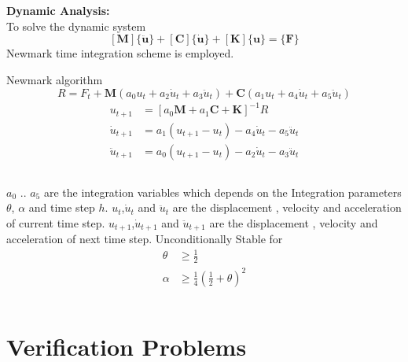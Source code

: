\documentclass[9pt]{beamer}
\begin{document}
\begin{frame}
\textbf{Dynamic Analysis:}\\
To solve the dynamic system
\begin{equation*}
\left[ \mathbf{M}  \right] 
\{ \ddot{\mathbf{u}} \}
+
\left[ \mathbf{C}  \right] 
\{ \dot{\mathbf{u}} \}
+
\left[ \mathbf{K}  \right] 
\{\mathbf{u} \}
=
\{ \mathbf{F} \}
\end{equation*}
Newmark time integration scheme is employed. 
\begin{block}{Newmark algorithm}
\begin{equation*}
R=F_t + \mathbf{M} \left(a_0 u_{t}+a_2 \dot{u}_{t} + a_3 \ddot{u}_{t} \right) + \mathbf{C} \left(a_1 u_{t}+a_4 \dot{u}_{t} + a_5 \ddot{u}_{t} \right) 
\end{equation*}
\begin{align*}
u_{t+1} & =\left[a_0 \mathbf{M} + a_1 \mathbf{C} + \mathbf{K} \right] ^ {-1} R \\
\dot{u}_{t+1} & =a_1 \left( u_{t+1} - u_{t} \right) - a_4 \dot{u}_t -a_5 \ddot{u}_t \\
\ddot{u}_{t+1} & =a_0 \left( u_{t+1} - u_{t}\right) - a_2 \dot{u}_t -a_3 \ddot{u}_t
\end{align*}
\end{block}
\begin{columns}
$a_0$ .. $a_5$ are the integration variables which depends on the Integration parameters $\theta$, $\alpha$ and time step $h$. 
$u_t$,$\dot{u}_t$ and $\ddot{u}_t$ are the displacement , velocity and acceleration of current time step. $u_{t+1}$,$\dot{u}_{t+1}$ and $\ddot{u}_{t+1}$ are the displacement , velocity and acceleration of next time step. 
Unconditionally Stable for
\begin{align*}
\theta & \geq \frac{1}{2}  \\
\alpha & \geq \frac{1}{4}\left(\frac{1}{2}+\theta \right)^2
\end{align*}

\end{columns}
\end{frame}

\section{Verification Problems}
\end{document}
